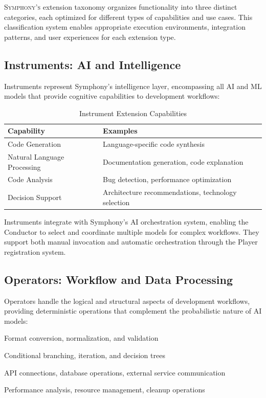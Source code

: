 
\lettrine{S}{ymphony's} extension taxonomy organizes functionality into three distinct categories, each optimized for different types of capabilities and use cases. This classification system enables appropriate execution environments, integration patterns, and user experiences for each extension type.

\subsection*{Instruments: AI and Intelligence}

\textcolor{brandPrimary}{Instruments} represent Symphony's intelligence layer, encompassing all AI and ML models that provide cognitive capabilities to development workflows:

\begin{table}[ht]
\centering
\begin{tabular}{@{}ll@{}}
\toprule
\textbf{Capability} & \textbf{Examples} \\
\midrule
Code Generation & Language-specific code synthesis \\
Natural Language Processing & Documentation generation, code explanation \\
Code Analysis & Bug detection, performance optimization \\
Decision Support & Architecture recommendations, technology selection \\
\bottomrule
\end{tabular}
\caption{Instrument Extension Capabilities}
\end{table}

Instruments integrate with Symphony's AI orchestration system, enabling the Conductor to select and coordinate multiple models for complex workflows. They support both manual invocation and automatic orchestration through the Player registration system.

\subsection*{Operators: Workflow and Data Processing}

\textcolor{brandSecondary}{Operators} handle the logical and structural aspects of development workflows, providing deterministic operations that complement the probabilistic nature of AI models:

\begin{description}[leftmargin=4cm,labelwidth=3.5cm]
    \item[\textbf{Data Transformation}] Format conversion, normalization, and validation
    \item[\textbf{Workflow Logic}] Conditional branching, iteration, and decision trees
    \item[\textbf{Integration}] API connections, database operations, external service communication
    \item[\textbf{Optimization}] Performance analysis, resource management, cleanup operations
\end{description}


